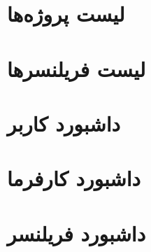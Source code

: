 \section{لیست پروژه‌ها}
\section{لیست فریلنسرها}
\section{داشبورد کاربر}
\section{داشبورد کارفرما}
\section{داشبورد فریلنسر}